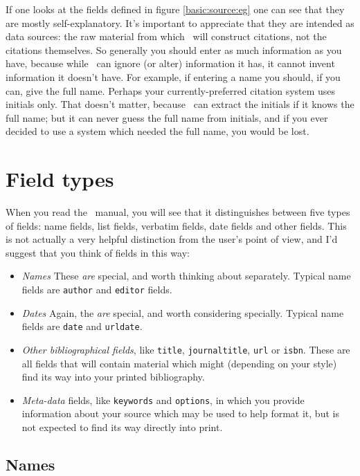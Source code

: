 {If one looks at the fields defined in figure \ref{basic:source:eg} one can see that they are mostly self-explanatory. It's important to appreciate that they are intended as data sources: the raw material from which \biblatex\ will construct citations, not the citations themselves. So generally you should enter as much information as you have, because while \biblatex\ can ignore (or alter) information it has, it cannot invent information it doesn't have. For example, if entering a name you should, if you can, give the full name. Perhaps your currently-preferred citation system uses initials only. That doesn't matter, because \biblatex\ can extract the initials if it knows the full name; but it can never guess the full name from initials, and if you ever decided to use a system which needed the full name, you would be lost.

\section{Field types}

When you read the \biblatex\ manual, you will see that it distinguishes between five types of fields: name fields, list fields, verbatim fields, date fields and other fields. This is not actually a very helpful distinction from the user's point of view, and I'd suggest that you think of fields in this way:
\begin{itemize}
\item \emph{Names} These \emph{are} special, and worth thinking about separately. Typical name fields are \texttt{author} and \texttt{editor} fields.
\item \emph{Dates} Again, the \emph{are} special, and worth considering specially. Typical name fields are \texttt{date} and \texttt{urldate}.
\item \emph{Other bibliographical fields}, like \texttt{title}, \texttt{journaltitle}, \texttt{url} or \texttt{isbn}. These are all fields that will contain material which might (depending on your style) find its way into your printed bibliography.
\item \emph{Meta-data} fields, like \texttt{keywords} and \texttt{options}, in which you provide information about your source which may be used to help format it, but is not expected to find its way directly into print.
\end{itemize} 

\subsection{Names}

}
